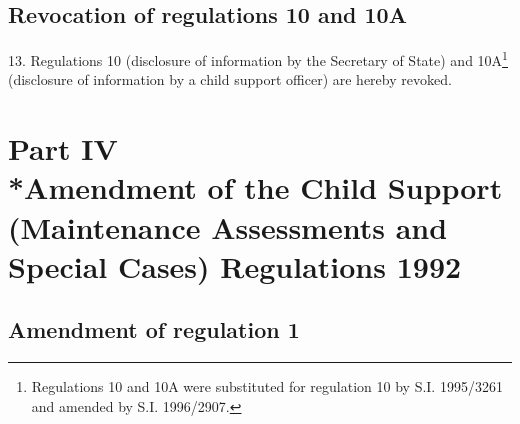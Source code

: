 \documentclass[12pt,a4paper]{article}
\begin{document}
\subsection[13. Revocation of regulations 10 and 10A]{Revocation of regulations 10 and 10A}

13.  Regulations 10 (disclosure of information by the Secretary of State) and 10A\footnote{\frenchspacing Regulations 10 and 10A were substituted for regulation 10 by S.I. 1995/3261 and amended by S.I. 1996/2907.} (disclosure of information by a child support officer) are hereby revoked.

\section[Part IV --- Amendment of the Child Support (Maintenance Assessments and Special Cases) Regulations 1992]{Part IV\\*Amendment of the Child Support (Maintenance Assessments and Special Cases) Regulations 1992}

\renewcommand\parthead{--- Part IV}

\subsection[14. Amendment of regulation 1]{Amendment of regulation 1}
\end{document}
